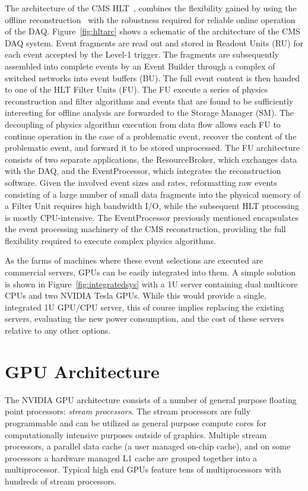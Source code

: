 \documentclass{JINST}
\begin{document}
The architecture of the CMS HLT~\cite{Sphicas:2002gg},\cite{Sakulin:2007rj} combines the flexibility gained by using the offline
reconstruction~\cite{bib:datamodel} with the robustness required for reliable online operation of the DAQ. Figure~\ref{fig:hltarc} shows 
a schematic of the architecture of the CMS DAQ system. Event fragments are read out and stored in Readout Units (RU) for each event accepted
by the Level-1 trigger. The fragments are subsequently assembled into complete events by an Event Builder through a complex of switched 
networks into event buffers (BU). The full event content is then handed to one of the HLT Filter Units (FU). The FU execute a series of 
physics reconstruction and filter algorithms and events that are found to be sufficiently interesting for offline analysis are forwarded 
to the Storage Manager (SM). The decoupling of physics algorithm execution from data flow allows each FU to continue operation in the case of a problematic event, recover the
content of the problematic event, and forward it to be stored unprocessed. The FU architecture consists of 
two separate applications, the ResourceBroker, which exchanges data with the DAQ, and the EventProcessor, which integrates the reconstruction
software. Given the involved event sizes and rates, reformatting raw events consisting of a large number of small data fragments into the physical 
memory of a Filter Unit requires high bandwidth I/O, while the subsequent HLT processing is mostly CPU-intensive.
The EventProcessor previously mentioned encapsulates the event processing machinery of the CMS reconstruction, providing the full flexibility 
required to execute complex physics algorithms. 

As the farms of machines where these event selections are executed are commercial servers, GPUs can be easily integrated into them.
A simple solution is shown in Figure~\ref{fig:integratedsys} with a 1U server containing dual multicore CPUs and two NVIDIA Tesla GPUs. 
While this would provide a single, integrated 1U GPU/CPU server, this of course implies replacing the existing servers, 
evaluating the new power consumption, and the cost of these servers relative to any other options.

\section{GPU Architecture}

The NVIDIA GPU architecture consists of a
number of general purpose floating point processors: {\it stream processors}.
The stream processors are fully programmable and can be utilized as general
purpose compute cores for computationally intensive purposes outside of graphics.
Multiple stream processors, a parallel data cache (a user managed
on-chip cache), and on some processors a hardware managed L1 cache are
grouped together into a multiprocessor.  Typical high end GPUs feature tens
of multiprocessors with hundreds of stream processors.
\end{document}
